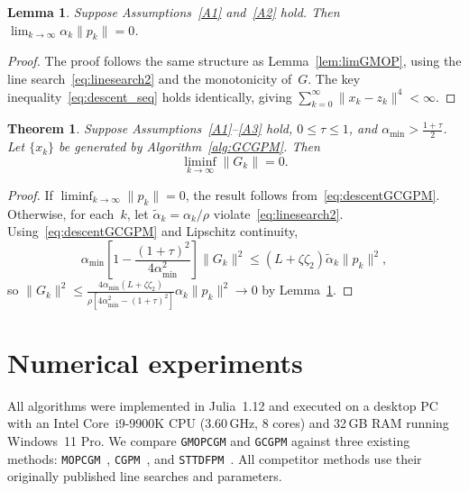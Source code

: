 \documentclass{article}
\theoremstyle{plain}
\newtheorem{theorem}{Theorem}
\newtheorem{lemma}{Lemma}
\theoremstyle{definition}
\theoremstyle{remark}
\newcommand{\norm}[1]{\|#1\|}
\newcommand{\algoname}[1]{{\small\texttt{#1}}}
\newcommand{\GMOPCGM}{\algoname{GMOPCGM}}
\newcommand{\GCGPM}{\algoname{GCGPM}}
\newcommand{\MOPCGM}{\algoname{MOPCGM}}
\newcommand{\CGPM}{\algoname{CGPM}}
\newcommand{\STTDFPM}{\algoname{STTDFPM}}
\begin{document}
\begin{lemma}\label{lem:limGCGPM}
Suppose Assumptions~\ref{A1} and~\ref{A2} hold. Then $\lim_{k\to\infty}\alpha_k\norm{p_k} = 0$.
\end{lemma}
\begin{proof}
The proof follows the same structure as Lemma~\ref{lem:limGMOP}, using the line search~\eqref{eq:linesearch2} and the monotonicity of~$G$. The key inequality~\eqref{eq:descent_seq} holds identically, giving $\sum_{k=0}^\infty \norm{x_k - z_k}^4 < \infty$.
\end{proof}

\begin{theorem}\label{thm:convergenceGCGPM}
Suppose Assumptions~\ref{A1}--\ref{A3} hold, $0 \leq \tau \leq 1$, and $\alpha_{\min} > \frac{1+\tau}{2}$. Let $\{x_k\}$ be generated by Algorithm~\ref{alg:GCGPM}. Then
\[
  \liminf_{k\to\infty}\norm{G_k} = 0.
\]
\end{theorem}
\begin{proof}
If $\liminf_{k\to\infty}\norm{p_k} = 0$, the result follows from~\eqref{eq:descentGCGPM}. Otherwise, for each~$k$, let $\tilde{\alpha}_k = \alpha_k/\rho$ violate~\eqref{eq:linesearch2}. Using~\eqref{eq:descentGCGPM} and Lipschitz continuity,
\[
  \alpha_{\min}\!\left[1 - \frac{(1+\tau)^2}{4\alpha_{\min}^2}\right]\norm{G_k}^2 \leq (L + \zeta\zeta_2)\tilde{\alpha}_k\norm{p_k}^2,
\]
so $\norm{G_k}^2 \leq \frac{4\alpha_{\min}(L+\zeta\zeta_2)}{\rho[4\alpha_{\min}^2 - (1+\tau)^2]}\alpha_k\norm{p_k}^2 \to 0$ by Lemma~\ref{lem:limGCGPM}.
\end{proof}

\section{Numerical experiments}\label{sec:experiments}

All algorithms were implemented in Julia~1.12 and executed on a desktop PC with an Intel Core~i9-9900K CPU (3.60\,GHz, 8 cores) and 32\,GB RAM running Windows~11 Pro. We compare \GMOPCGM{} and \GCGPM{} against three existing methods: \MOPCGM~\cite{sabi2023modified}, \CGPM~\cite{zheng2020conjugate}, and \STTDFPM~\cite{ibrahim2023two}. All competitor methods use their originally published line searches and parameters.
\end{document}
